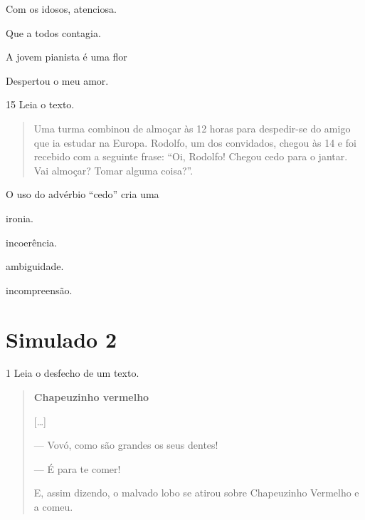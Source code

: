 \begin{escolha}
\item Com os idosos, atenciosa.

\item Que a todos contagia.

\item A jovem pianista é uma flor

\item Despertou o meu amor.
\end{escolha}



\num{15} Leia o texto.

\begin{quote}
Uma turma combinou de almoçar às 12 horas para despedir-se do amigo que
ia estudar na Europa. Rodolfo, um dos convidados, chegou às 14 e foi
recebido com a seguinte frase: ``Oi, Rodolfo! Chegou cedo para o jantar.
Vai almoçar? Tomar alguma coisa?''.

\end{quote}

O uso do advérbio ``cedo'' cria uma

\begin{escolha}
\item ironia.

\item incoerência.

\item ambiguidade.

\item incompreensão.
\end{escolha}

\chapter{Simulado 2}

\num{1} Leia o desfecho de um texto.

\begin{quote}
\textbf{Chapeuzinho vermelho}

{[}\ldots{}{]}

--- Vovó, como são grandes os seus dentes!

--- É para te comer!

E, assim dizendo, o malvado lobo se atirou sobre Chapeuzinho Vermelho e a
comeu.

\end{quote}


